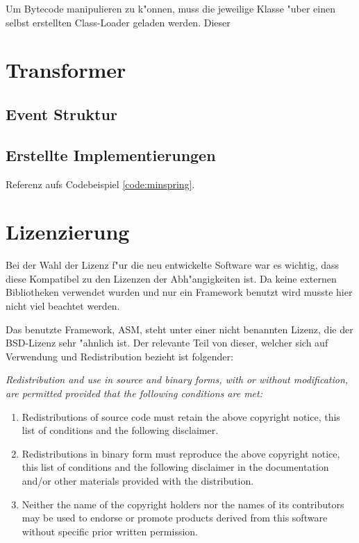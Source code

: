 Um Bytecode manipulieren zu k"onnen, muss die jeweilige Klasse "uber einen selbst erstellten Class-Loader geladen werden. Dieser 

\section{Transformer} 



\subsection{Event Struktur} 



\subsection{Erstellte Implementierungen} 


Referenz aufs Codebeispiel \ref{code:minspring}.

 

\section{Lizenzierung} 

Bei der Wahl der Lizenz f"ur die neu entwickelte Software war es wichtig, dass diese Kompatibel zu den Lizenzen der Abh"angigkeiten ist. Da keine externen Bibliotheken verwendet wurden und nur ein Framework benutzt wird musste hier nicht viel beachtet werden.

Das benutzte Framework, ASM, steht unter einer nicht benannten Lizenz, die der BSD-Lizenz sehr "ahnlich ist. Der relevante Teil von dieser, welcher sich auf Verwendung und Redistribution bezieht ist folgender:

{\itshape
Redistribution and use in source and binary forms, with or without
modification, are permitted provided that the following conditions
are met:

\begin{enumerate}
	\item Redistributions of source code must retain the above copyright notice, this list of conditions and the following disclaimer.
	\item Redistributions in binary form must reproduce the above copyright notice, this list of conditions and the following disclaimer in the documentation and/or other materials provided with the distribution.
	\item Neither the name of the copyright holders nor the names of its contributors may be used to endorse or promote products derived from this software without specific prior written permission.
\end{enumerate}
}
\cite{asm_license}

